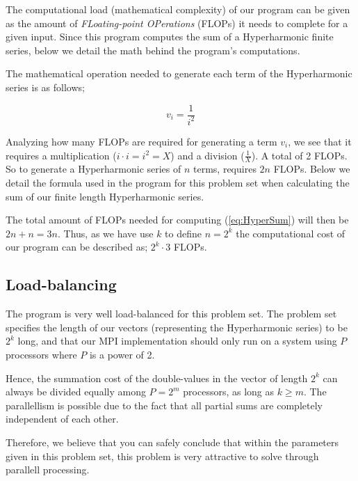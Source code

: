 \documentclass[fontsize=11pt,paper=a4,titlepage]{report}
\begin{document}
The computational load (mathematical complexity) of our program can be given as
the amount of \textit{FLoating-point OPerations} (FLOPs) it needs to complete
for a given input. Since this program computes the sum of a Hyperharmonic finite
series, below we detail the math behind the program's computations.

The mathematical operation needed to generate each term of the Hyperharmonic
series is as follows;

\begin{equation}
	v_i = \frac{1}{i^2}
\end{equation}

Analyzing how many FLOPs are required for generating a term $v_i$, we see that
it requires a multiplication ($i\cdot i = i^2 = X$) and a division
($\frac{1}{X}$). A total of 2 FLOPs. So to generate a Hyperharmonic series of
$n$ terms, requires $2n$ FLOPs. Below we detail the formula used in the program
for this problem set when calculating the sum of our finite length Hyperharmonic
series.

The total amount of FLOPs needed for computing (\ref{eq:HyperSum}) will then be
$2n + n = 3n$. Thus, as we have use $k$ to define $n=2^k$ the computational cost
of our program can be described as; $2^k\cdot 3$ FLOPs.

\subsection{Load-balancing}

The program is very well load-balanced for this problem set. The problem set
specifies the length of our vectors (representing the Hyperharmonic series) to
be $2^k$ long, and that our MPI implementation should only run on a system using
$P$ processors where $P$ is a power of 2.

Hence, the summation cost of the double-values in the vector of length $2^k$ can
always be divided equally among $P = 2^m$ processors, as long as $k\geq m$. The
parallellism is possible due to the fact that all partial sums are completely
independent of each other. \newline

Therefore, we believe that you can safely conclude that within the parameters
given in this problem set, this problem is very attractive to solve through
parallell processing.

\end{document}
